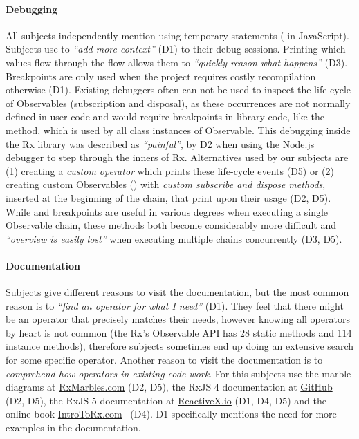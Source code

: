 \paragraph{Debugging}
All subjects independently mention using temporary \printfdebugging{} statements ( in JavaScript).
Subjects use \printfdebugging{} to \emph{``add more context''} (D1) to their debug sessions. 
Printing which values flow through the flow allows them to \emph{``quickly reason what happens''} (D3). 
Breakpoints are only used when the project requires costly recompilation otherwise (D1).
Existing debuggers often can not be used to inspect the life-cycle of Observables (subscription and disposal),
as these occurrences are not normally defined in user code and would require breakpoints in library code, 
like the -method, which is used by all class instances of Observable. 
This debugging inside the Rx library was described as \emph{``painful''}, by D2 when using the Node.js debugger to step through the inners of Rx.
Alternatives used by our subjects are (1) creating a \emph{custom  operator} which prints these life-cycle events (D5) or (2) creating custom Observables () with \emph{custom subscribe and dispose methods}, inserted at the beginning of the chain, that print upon their usage (D2, D5).
While \printfdebugging{} and breakpoints are useful in various degrees when executing a single Observable chain,
these methods both become considerably more difficult and \emph{``overview is easily lost''} when executing multiple chains concurrently (D3, D5).

\paragraph{Documentation}
Subjects give different reasons to visit the documentation, but the most common reason is to \emph{``find an operator for what I need''} (D1). They feel that there might be an operator that precisely matches their needs, however knowing all operators by heart is not common (the Rx's Observable API has 28 static methods and 114 instance methods), therefore subjects sometimes end up doing an extensive search for some specific operator. Another reason to visit the documentation is to \emph{comprehend how operators in existing code work}. For this subjects use the marble diagrams at \href{http://rxmarbles.com}{RxMarbles.com} (D2, D5), the RxJS 4 documentation at \href{https://github.com/Reactive-Extensions/RxJS/blob/master/doc/}{GitHub} (D2, D5), the RxJS 5 documentation at \href{http://reactivex.io/rxjs}{ReactiveX.io} (D1, D4, D5) and the online book \href{http://introtorx.com}{IntroToRx.com}~\cite{introtorx} (D4). D1 specifically mentions the need for more examples in the documentation.

